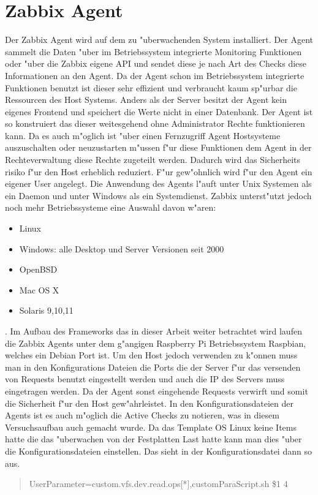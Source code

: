 \section{Zabbix Agent}
\label{sec:agent}
Der Zabbix Agent wird auf dem zu "uberwachenden System installiert. Der Agent sammelt die Daten "uber im Betriebssystem %
integrierte Monitoring Funktionen oder "uber die Zabbix eigene API und sendet diese je nach Art des Checks diese Informationen an den Agent. %
Da der Agent schon im Betriebssystem integrierte Funktionen benutzt ist dieser sehr effizient und verbraucht kaum sp"urbar %
die Ressourcen des Host Systems. Anders als der Server besitzt der Agent kein eigenes Frontend und speichert die Werte nicht %
in einer Datenbank. Der Agent ist so konstruiert das dieser weitesgehend ohne Administrator Rechte funktionieren kann. %
Da es auch m"oglich ist "uber einen Fernzugriff Agent Hostsysteme auszuschalten oder neuzustarten m"ussen f"ur diese Funktionen %
dem Agent in der Rechteverwaltung diese Rechte zugeteilt werden. Dadurch wird das Sicherheits%
risiko f"ur den Host erheblich reduziert. F"ur gew"ohnlich wird f"ur den Agent ein eigener User angelegt. Die Anwendung des Agents %
l"auft unter Unix Systemen als ein Daemon und unter Windows als ein Systemdienst. Zabbix unterst"utzt jedoch noch mehr %
Betriebssysteme eine Auswahl davon w"aren: 
\begin{itemize}
\item Linux
\item Windows: alle Desktop und Server Versionen seit 2000
\item OpenBSD
\item Mac OS X
\item Solaris 9,10,11
\end{itemize}
\autocite{zabbix:agent}.
Im Aufbau des Frameworks das in dieser Arbeit weiter betrachtet wird laufen die Zabbix Agents unter dem g"angigen Raspberry Pi %
Betriebssystem Raspbian, welches ein Debian Port ist. Um den Host jedoch verwenden zu k"onnen muss man in %
den Konfigurations Dateien die Ports die der Server f"ur das versenden von Requests benutzt eingestellt werden und auch die IP des Servers %
muss eingetragen werden. Da der Agent sonst eingehende Requests verwirft und somit die Sicherheit f"ur den Host gew"ahrleistet. %
In den Konfigurationsdateien der Agents ist es auch m"oglich %
die Active Checks zu notieren, was in diesem Versuchsaufbau auch gemacht wurde. Da das Template OS Linux keine Items hatte die das %
"uberwachen von der Festplatten Last hatte kann man dies "uber die Konfigurationsdateien einstellen. Das sieht in der Konfigurationsdatei %
dann so aus.
\begin{quote}

UserParameter=custom.vfs.dev.read.ops[*],customParaScript.sh \$1 4 

\end{quote}

